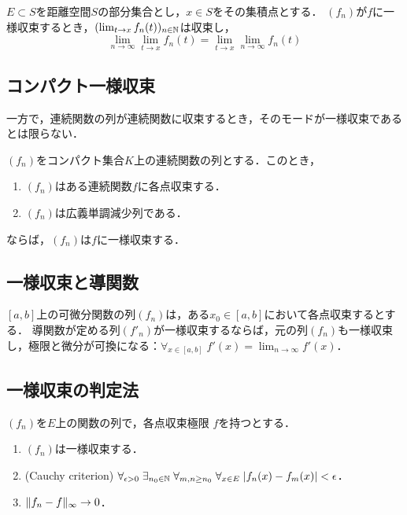 \documentclass[uplatex, dvipdfmx]{jsreport}
\begin{document}
\begin{theorem}
    $E\subset S$を距離空間$S$の部分集合とし，$x\in S$をその集積点とする．
    $(f_n)$が$f$に一様収束するとき，$(\lim_{t\to x}f_n(t))_{n\in\mathbb{N}}$は収束し，
    \[\lim_{n\to\infty}\lim_{t\to x}f_n(t)=\lim_{t\to x}\lim_{n\to\infty}f_n(t)\]
\end{theorem}

\subsection{コンパクト一様収束}

\begin{tcolorbox}[colframe=ForestGreen, colback=ForestGreen!10!white,breakable,colbacktitle=ForestGreen!40!white,coltitle=black,fonttitle=\bfseries\sffamily,
title=]
    一方で，連続関数の列が連続関数に収束するとき，そのモードが一様収束であるとは限らない．
\end{tcolorbox}

\begin{theorem}
    $(f_n)$をコンパクト集合$K$上の連続関数の列とする．このとき，
    \begin{enumerate}
        \item $(f_n)$はある連続関数$f$に各点収束する．
        \item $(f_n)$は広義単調減少列である．
    \end{enumerate}
    ならば，$(f_n)$は$f$に一様収束する．
\end{theorem}

\subsection{一様収束と導関数}

\begin{theorem}
    $[a,b]$上の可微分関数の列$(f_n)$は，ある$x_0\in[a,b]$において各点収束するとする．
    導関数が定める列$(f'_n)$が一様収束するならば，元の列$(f_n)$も一様収束し，極限と微分が可換になる：$\forall_{x\in[a,b]}\;f'(x)=\lim_{n\to\infty}f'(x)$．
\end{theorem}

\subsection{一様収束の判定法}

\begin{proposition}[一様収束の判定法]
    $(f_n)$を$E$上の関数の列で，各点収束極限
    $f$を持つとする．
    \begin{enumerate}
        \item $(f_n)$は一様収束する．
        \item (Cauchy criterion) $\forall_{\epsilon>0}\;\exists_{n_0\in\mathbb{N}}\;\forall_{m,n\ge n_0}\;\forall_{x\in E}\;\lvert f_n(x)-f_m(x)\rvert<\epsilon$．
        \item $\|f_n-f\|_\infty\to0$．
    \end{enumerate}
\end{proposition}
\end{document}
